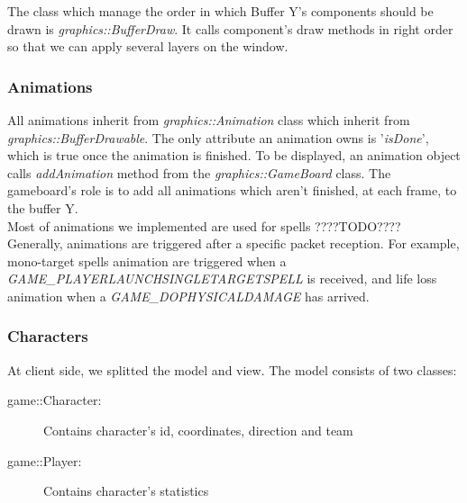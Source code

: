 \documentclass{scrreprt}
\begin{document}
		The class which manage the order in which Buffer Y's components should be drawn is \emph{graphics::BufferDraw}. It calls component's draw methods in right order so that we can apply several layers on the window.

		\subsubsection{Animations}
		All animations inherit from \emph{graphics::Animation} class which inherit from \emph{graphics::BufferDrawable}. The only attribute an animation owns is '\emph{isDone}', which is true once the animation is finished. To be displayed, an animation object calls \emph{addAnimation} method from the \emph{graphics::GameBoard} class. The gameboard's role is to add all animations which aren't finished, at each frame, to the buffer Y.\\

		Most of animations we implemented are used for spells ????TODO????\\


			Generally, animations are triggered after a specific packet reception. For example, mono-target spells animation are triggered when a \emph{GAME\_PLAYERLAUNCHSINGLETARGETSPELL} is received, and life loss animation when a \emph{GAME\_DOPHYSICALDAMAGE} has arrived.

			\subsubsection{Characters}
			At client side, we splitted the model and view. The model consists of two classes:
			\begin{description}
			\item[game::Character:]{Contains character's id, coordinates, direction and team}
			\item[game::Player:]{Contains character's statistics}
			\end{description}
\end{document}
